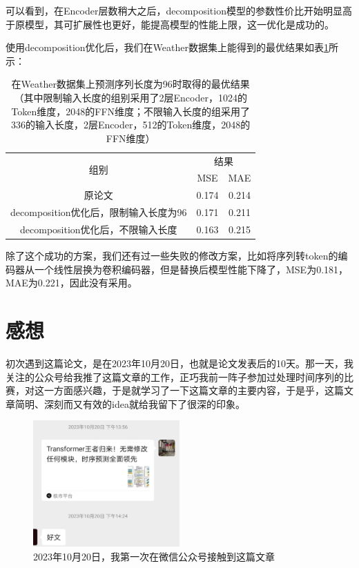 \documentclass[twoside,12pt]{article}
\begin{document}
可以看到，在Encoder层数稍大之后，decomposition模型的参数性价比开始明显高于原模型，其可扩展性也更好，能提高模型的性能上限，这一优化是成功的。

使用decomposition优化后，我们在Weather数据集上能得到的最优结果如表\ref{tab:result_best}所示：

\begin{table}[htbp]
  \caption{在Weather数据集上预测序列长度为96时取得的最优结果（其中限制输入长度的组别采用了2层Encoder，1024的Token维度，2048的FFN维度；不限输入长度的组采用了336的输入长度，2层Encoder，512的Token维度，2048的FFN维度）}
  \label{tab:result_best}
  \vspace{5pt}
  \centering
  \begin{tabular}{c|cc}
    \toprule
    \multirow{2}{*}{组别}                 & \multicolumn{2}{c}{结果}         \\
    \cmidrule(lr){2-3}
                                          & MSE                      & MAE   \\
    \midrule
    原论文                                & 0.174                    & 0.214 \\
    decomposition优化后，限制输入长度为96 & 0.171                    & 0.211 \\
    decomposition优化后，不限输入长度     & 0.163                    & 0.215 \\
    \bottomrule
  \end{tabular}
\end{table}

除了这个成功的方案，我们还有过一些失败的修改方案，比如将序列转token的编码器从一个线性层换为卷积编码器，但是替换后模型性能下降了，MSE为0.181，MAE为0.221，因此没有采用。

\section{感想}

初次遇到这篇论文，是在2023年10月20日，也就是论文发表后的10天。那一天，我关注的公众号给我推了这篇文章的工作，正巧我前一阵子参加过处理时间序列的比赛，对这一方面感兴趣，于是就学习了一下这篇文章的主要内容，于是乎，这篇文章简明、深刻而又有效的idea就给我留下了很深的印象。

\begin{figure}[htbp]
  \centering
  \includegraphics[width=0.5\textwidth]{./pic/itransformer_公众号.jpg}
  \caption{2023年10月20日，我第一次在微信公众号接触到这篇文章}
  \label{fig:wechat}
\end{figure}
\end{document}
